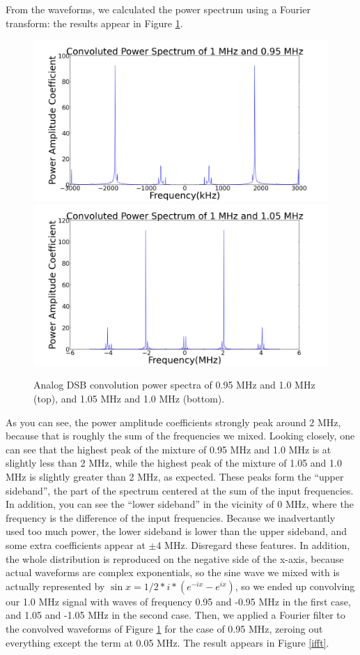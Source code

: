 \documentclass[11pt]{article}
\begin{document}
From the waveforms, we calculated the power spectrum using a Fourier transform: the results appear in Figure \ref{adsb}.

\begin{figure}
\centering
\includegraphics[scale=0.35]{pictures/opointninefive}
\includegraphics[scale=0.35]{pictures/onepointofive}
\caption{Analog DSB convolution power spectra of 0.95 MHz and 1.0 MHz (top), and 1.05 MHz and 1.0 MHz (bottom). \label{adsb}}
\end{figure}

 As you can see, the power amplitude coefficients strongly peak around 2 MHz, because that is roughly the sum of the frequencies we mixed. Looking closely, one can see that the highest peak of the mixture of 0.95 MHz and 1.0 MHz is at slightly less than 2 MHz, while the highest peak of the mixture of 1.05 and 1.0 MHz is slightly greater than 2 MHz, as expected. These peaks form the ``upper sideband'', the part of the spectrum centered at the sum of the input frequencies. In addition, you can see the ``lower sideband'' in the vicinity of 0 MHz, where the frequency is the difference of the input frequencies. Because we inadvertantly used too much power, the lower sideband is lower than the upper sideband, and some extra coefficients appear at $\pm 4$ MHz. Disregard these features. In addition, the whole distribution is reproduced on the negative side of the x-axis, because actual waveforms are complex exponentials, so the sine wave we mixed with is actually represented by $\sin{x} = 1/2 * i * (e^{-ix} - e^{ix})$, so we ended up convolving our 1.0 MHz signal with waves of frequency 0.95 and -0.95 MHz  in the first case, and 1.05 and -1.05 MHz in the second case. Then, we applied a Fourier filter to the convolved waveforms of Figure \ref{adsb} for the case of 0.95 MHz, zeroing out everything except the term at 0.05 MHz. The result appears in Figure \ref{ifft}. 
\end{document}

